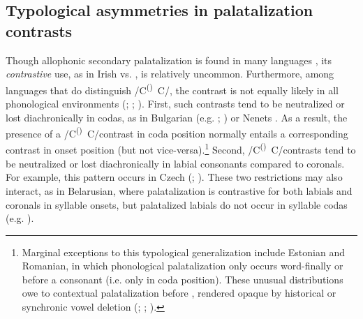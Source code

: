 \documentclass[output=paper,colorlinks,citecolor=brown]{langscibook}
\newcommand{\pal}{\ipa{ʲ}}
\newcommand{\vel}{\ipa{ˠ}}
\newcommand{\velop}{\textsuperscript{(}\vel\textsuperscript{)}}
\newcommand{\palcongen}{/C\velop\ C\pal/}
\begin{document}
\subsection{Typological asymmetries in palatalization contrasts}
Though allophonic secondary palatalization is found in many languages \citep{Bateman2011_pal_typology}, its \textit{contrastive} use, as in Irish  vs. , is relatively uncommon. Furthermore, among languages that do distinguish \palcongen, the contrast is not equally likely in all phonological environments (\cite{Takatori1997_Slavic_phono_PhD}; \cite{Kochetov2002_diss}; \cite{Iskarous_Kavitskaya2018_Slavic_palatalization}). First, such contrasts tend to be 
neutralized or lost diachronically in codas, as in Bulgarian (e.g. \cite{Scatton1993_Bulgarian_phono}; \cite{Iskarous_Kavitskaya2018_Slavic_palatalization}) or Nenets \citep[e.g.][]{Kochetov2002_diss}. As a result, the presence of a \palcongen contrast in coda position normally entails a corresponding contrast in onset position (but not vice-versa).\footnote{Marginal exceptions to this typological generalization include Estonian and Romanian, in which phonological palatalization only occurs word\hyp finally or before a consonant (i.e. only in coda position). These unusual distributions owe to contextual palatalization before , rendered opaque by historical or synchronic vowel deletion (\cite{Operstein2010_C_prevocalization}; \cite{Chitoran2013_Romanian_phono}; \cite{Malmi_etal2023_Estonian_pal}).} Second, \palcongen contrasts tend to be neutralized or lost diachronically in labial consonants compared to coronals. For example, this pattern occurs in Czech (\cite{Short1993_Czech_phono}; \cite{Iskarous_Kavitskaya2018_Slavic_palatalization}). These two restrictions may also interact, as in Belarusian, where palatalization is contrastive for both labials and coronals in syllable onsets, but palatalized labials do not occur in syllable codas (e.g. \citealt{Bird_Litvin2021_Belarusian_JIPA}).
\end{document}
